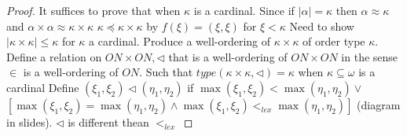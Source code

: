 \begin{proof}
    It suffices to prove that when $\kappa$ is a cardinal.
    Since if $|\alpha| = \kappa$ then $\alpha \approx \kappa$
    and $\alpha \times \alpha \approx \kappa \times \kappa$
    $\kappa \preceq \kappa \times \kappa$ by $f(\xi) = (\xi, \xi)$ for $\xi < \kappa$
    Need to show $|\kappa \times \kappa | \leq \kappa$ for $\kappa$ a cardinal.
    Produce a well-ordering of $\kappa \times \kappa$ of order type $\kappa$.
    Define a relation on $ON \times ON, \triangleleft$ that is a well-ordering of $ON \times ON$
    in the sense $\in$ is a well-ordering of $ON$.
    Such that $type(\kappa \times \kappa, \triangleleft) = \kappa$ when $\kappa \subseteq \omega$ is a cardinal
    Define $(\xi_1,\xi_2) \triangleleft (\eta_1,\eta_2)$
    if $\max(\xi_1,\xi_2) < \max(\eta_1,\eta_2) \vee$
    $[\max(\xi_1,\xi_2) = \max(\eta_1,\eta_2) \wedge \max(\xi_1,\xi_2) <_{lex} \max(\eta_1,\eta_2)]$
    (diagram in slides).
    $\triangleleft$ is different thean $<_{lex}$
\end{proof}



%